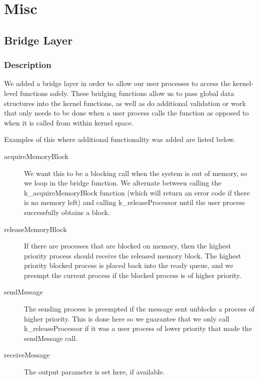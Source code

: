 \documentclass[12pt]{report}
\begin{document}
\chapter{Misc}

\section{Bridge Layer}

\subsection{Description}
    We added a bridge layer in order to allow our user processes to access the
    kernel-level functions safely.  These bridging functions allow us to pass
    global data structures into the kernel functions, as well as do additional
    validation or work that only needs to be done when a user process calls the
    function as opposed to when it is called from within kernel space.

    Examples of this where additional functionality was added are listed below.

    \begin{description}
        \item [acquireMemoryBlock] We want this to be a blocking call when
            the system is out of memory, so we loop in the bridge function.  We
            alternate between calling the k\_acquireMemoryBlock function (which
            will return an error code if there is no memory left) and calling
            k\_releaseProcessor until the user process successfully obtains a
            block.
        \item [releaseMemoryBlock] If there are processes that are blocked on
            memory, then the highest priority process should receive the
            released memory block.  The highest priority blocked process is
            placed back into the ready queue, and we preempt the current process
            if the blocked process is of higher priority.
        \item [sendMessage] The sending process is preempted if the message sent
            unblocks a process of higher priority.  This is done here so we
            guarantee that we only call k\_releaseProcessor if it was a user
            process of lower priority that made the sendMessage call.
        \item [receiveMessage] The output parameter is set here, if available.
    \end{description}
\end{document}
